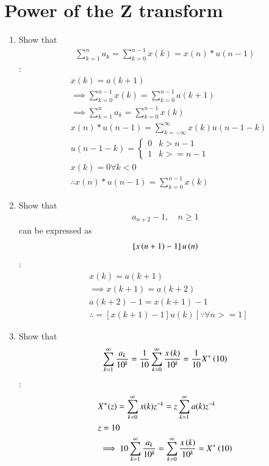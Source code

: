 \documentclass[journal,12pt,twocolumn]{IEEEtran}
\renewcommand\thesection{\arabic{section}}
\begin{document}
\section{Power of the Z transform}
\begin{enumerate}[label=\thesection.\arabic*,ref=\thesection.\theenumi]
\item Show that 
\begin{align}
	\sum_{k=1}^{n}a_k = 
	\sum_{k=0}^{n-1}x(k) = x(n)*u(n-1)
\end{align}
\solution:
\begin{align}
	& x(k)=a(k+1)\\
	&\implies \sum_{k=0}^{n-1} x(k)=\sum_{k=0}^{n-1} a(k+1)\\
	&\implies \sum_{k=1}^{n}a_{k} = \sum_{k=0}^{n-1}x(k)\\
	& x(n)*u(n-1)=\sum_{k=-\infty}^{\infty} x(k) u(n-1-k)\\
	&u(n-1-k)=\begin{cases}
		0 & k>n-1\\
		1 & k>=n-1
	\end{cases}\\
	&x(k)=0 \forall k<0\\
	&\therefore x(n)*u(n-1)=\sum_{k=0}^{n-1} x(k)
\end{align}
\item Show that 
\begin{align}
	a_{n+2}-1, \quad n \ge 1
\end{align}
can be expressed as 
\begin{align}
	{}\left[x\left(n+1\right)-1\right]u\left(n\right)
\end{align}
\solution:
\begin{align}
	&x(k)=a(k+1)\\
	&\implies x(k+1)=a(k+2)\\
	&a(k+2)-1=x(k+1)-1\\
	&\therefore =[x(k+1)-1]u(k)[\because \forall n>=1]
\end{align}
\item Show that 
\begin{align}
	\sum_{k=1}^{\infty}\frac{a_k}{10^k}= 
	\frac{1}{10}\sum_{k=0}^{\infty}\frac{x\left(k\right)}{10^k} =\frac{1}{10}X^{+}\left({10}\right)
\end{align}
\solution:
\begin{align}
	&X^{+}(z)=\sum_{k=0}^{\infty} x(k)z^{-k}=z\sum_{k=1}^{\infty} a(k) z^{-k}\\
	&z=10\\
	&\implies 10\sum_{k=1}^{\infty}\frac{a_k}{10^k}=\sum_{k=0}^{\infty}\frac{x\brak{k}}{10^k} =X^{+}\brak{{10}}\\

\end{align}
\end{enumerate}
\end{document}
